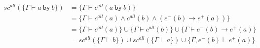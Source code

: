 \documentclass[12pt]{article}
\newcommand{\by}{~\texttt{by}~}
\begin{document}
\begin{align*}
  \\
  sc^{all} (\{\Gamma \vdash a \by b\}) & = \{\Gamma \vdash c^{all}(a \by b)\}                                                                                            \\
                                       & = \{\Gamma \vdash c^{all}(a) \land c^{all} (b) \land (e^-(b) \rightarrow e^+(a))\}                                              \\
                                       & = \{\Gamma \vdash c^{all}(a) \} \cup \{\Gamma \vdash c^{all} (b) \} \cup \{\Gamma \vdash e^-(b) \rightarrow e^+(a)\}            \\
                                       & = sc^{all}(\{\Gamma \vdash b \}) \cup sc^{all}(\{\Gamma \vdash a\}) \cup \{\Gamma, e^-(b) \vdash e^+(a)\}                       \\
\end{align*}
\end{document}
